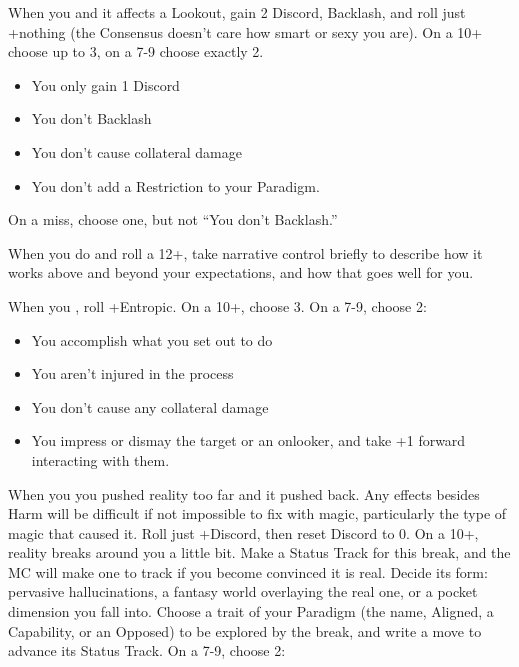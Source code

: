 \begin{multicols}{3}
  \SEPARATOR

  \begin{move}
    When you  and it affects a Lookout, gain 2 Discord, Backlash, and roll just +nothing (the Consensus doesn’t care how smart or sexy you are). On a 10+ choose up to 3, on a 7-9 choose exactly 2. 

    \begin{itemize}
      \setlength\itemsep{0em}
    \item You only gain 1 Discord
    \item You don’t Backlash
    \item You don’t cause collateral damage
    \item You don’t add a Restriction to your Paradigm. 
    \end{itemize}
On a miss, choose one, but not “You don’t Backlash.”

  \end{move}

  \SEPARATOR

  \begin{move}
    When you do  and roll a 12+, take narrative control briefly to describe how it works above and beyond your expectations, and how that goes well for you.

  \end{move}

  \columnbreak
  
  \begin{move}
     When you , roll +Entropic. On a 10+, choose 3. On a 7-9, choose 2:

    \begin{itemize}
      \setlength\itemsep{0em}
    \item You accomplish what you set out to do
    \item You aren’t injured in the process
    \item You don’t cause any collateral damage
    \item You impress or dismay the target or an onlooker, and take +1 forward interacting with them.
    \end{itemize}
  \end{move}

  \SEPARATOR

  \begin{move}
    When you  you pushed reality too far and it pushed back. Any effects besides Harm will be difficult if not impossible to fix with magic, particularly the type of magic that caused it. Roll just +Discord, then reset Discord to 0. On a 10+, reality breaks around you a little bit. Make a Status Track for this break, and the MC will make one to track if you become convinced it is real. Decide its form: pervasive hallucinations, a fantasy world overlaying the real one, or a pocket dimension you fall into. Choose a trait of your Paradigm (the name, Aligned, a Capability, or an Opposed) to be explored by the break, and write a move to advance its Status Track. 
On a 7-9, choose 2:


\end{move}
\end{multicols}
